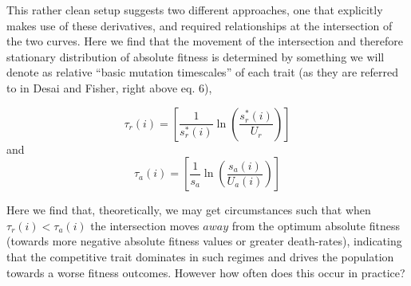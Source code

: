\documentclass[9pt,twocolumn,twoside]{article}
\begin{document}
\begin{enumerate}
    
This rather clean setup suggests two different approaches, one that explicitly makes use of these derivatives, and required relationships at the intersection of the two curves. Here we find that the movement of the intersection and therefore stationary distribution of absolute fitness is determined by something we will denote as relative “basic mutation timescales” of each trait (as they are referred to in Desai and Fisher, right above eq. 6),

$$\tau_{r}(i) = \left[\frac{1}{s_{r}^{*}(i)}\ln \left(\frac{s_{r}^{*}(i)}{U_{r}}\right)\right]$$ and $$\tau_{a}(i) = \left[\frac{1}{s_{a}}\ln \left(\frac{s_{a}(i)}{U_{a}(i)}\right)\right]$$

Here we find that, theoretically, we may get circumstances such that when $\tau_{r}(i)  < \tau_{a}(i)$ the intersection moves $away$ from the optimum absolute fitness (towards more negative absolute fitness values or greater death-rates), indicating that the competitive trait dominates in such regimes and drives the population towards a worse fitness outcomes. However how often does this occur in practice? 
    
\end{enumerate}
\end{document}
